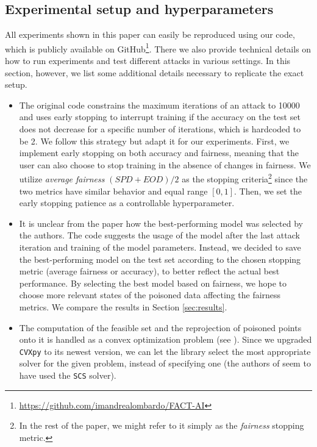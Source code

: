 \subsection{Experimental setup and hyperparameters}
All experiments shown in this paper can easily be reproduced using our code, which is publicly available on GitHub\footnote{\url{https://github.com/imandrealombardo/FACT-AI}}. There we also provide technical details on how to run experiments and test different attacks in various settings. In this section, however, we list some additional details necessary to replicate the exact setup. 
\begin{itemize}%
    
    \item The original code constrains the maximum iterations of an attack to 10000 and uses early stopping to interrupt training if the accuracy on the test set does not decrease for a specific number of iterations, which is hardcoded to be 2. We follow this strategy but adapt it for our experiments. First, we implement early stopping on both accuracy and fairness, meaning that the user can also choose to stop training in the absence of changes in fairness. We utilize \textit{average fairness} $(SPD+EOD)/2$ as the stopping criteria\footnote{In the rest of the paper, we might refer to it simply as the \textit{fairness} stopping metric.} since the two metrics have similar behavior and equal range $[0,1]$. Then, we set the early stopping patience as a controllable hyperparameter.
    
    \item It is unclear from the paper how the best-performing model was selected by the authors. The code suggests the usage of the model after the last attack iteration and training of the model parameters. Instead, we decided to save the best-performing model on the test set according to the chosen stopping metric (average fairness or accuracy), to better reflect the actual best performance. By selecting the best model based on fairness, we hope to choose more relevant states of the poisoned data affecting the fairness metrics. We compare the results in Section \ref{sec:results}.
    
    \item The computation of the feasible set and the reprojection of poisoned points onto it is handled as a convex optimization problem (see \cite{koh2018}). Since we upgraded \texttt{CVXpy} to its newest version, we can let the library select the most appropriate solver for the given problem, instead of specifying one (the authors of \cite{originalpaper} seem to have used the \texttt{SCS} solver).
    

\end{itemize}
